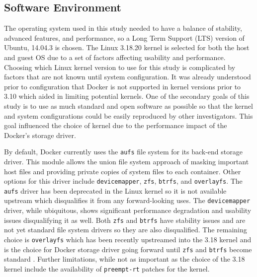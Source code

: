 
\subsection{Software Environment} %
\label{sub:software_environment}
The operating system used in this study needed to have a balance of stability, advanced features, and performance, so a Long Term Support (LTS) version of Ubuntu, 14.04.3 is chosen.
The Linux 3.18.20 kernel is selected for both the host and guest OS due to a set of factors affecting usability and performance.
Choosing which Linux kernel version to use for this study is complicated by factors that are not known until system configuration.
It was already understood prior to configuration that Docker is not supported in kernel versions prior to 3.10 which aided in limiting potential kernels.
One of the secondary goals of this study is to use as much standard and open software as possible so that the kernel and system configurations could be easily reproduced by other investigators.
This goal influenced the choice of kernel due to the performance impact of the Docker's storage driver.

By default, Docker currently uses the \texttt{aufs} file system for its back-end storage driver.
This module allows the union file system approach of masking important host files and providing private copies of system files to each container.
Other options for this driver include \texttt{devicemapper}, \texttt{zfs}, \texttt{btrfs}, and \texttt{overlayfs}.
The \texttt{aufs} driver has been deprecated in the Linux kernel so it is not available upstream which disqualifies it from any forward-looking uses.
The \texttt{devicemapper} driver, while ubiquitous, shows significant performance degradation and usability issues disqualifying it as well.
Both \texttt{zfs} and \texttt{btrfs} have stability issues and are not yet standard file system drivers so they are also disqualified.
The remaining choice is \texttt{overlayfs} which has been recently upstreamed into the 3.18 kernel and is the choice for Docker storage driver going forward until \texttt{zfs} and \texttt{btrfs} become standard \autocite{petazzonistorage, redhatstorage}.
Further limitations, while not as important as the choice of the 3.18 kernel include the availability of \texttt{preempt-rt} patches for the kernel.

